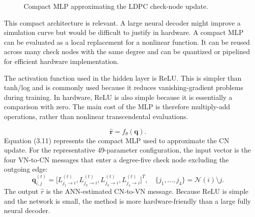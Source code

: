 \begin{figure}[H]
\centering
{}
\caption{Compact MLP approximating the LDPC check-node update.}
\label{fig:ann_ldpc_mlp}
\end{figure}

This compact architecture is relevant. A large neural decoder might improve a simulation curve but would be difficult to justify in hardware. A compact MLP can be evaluated as a local replacement for a nonlinear function. It can be reused across many check nodes with the same degree and can be quantized or pipelined for efficient hardware implementation.

The activation function used in the hidden layer is ReLU. This is simpler than tanh/log and is commonly used because it reduces vanishing-gradient problems during training. In hardware, ReLU is also simple because it is essentially a comparison with zero. The main cost of the MLP is therefore multiply-add operations, rather than nonlinear transcendental evaluations.

\begin{equation}
\hat{\mathbf{r}}=f_{\theta}(\mathbf{q}).
\end{equation}
Equation (3.11) represents the compact MLP used to approximate the CN update. For the representative 49-parameter configuration, the input vector is the four VN-to-CN messages that enter a degree-five check node excluding the outgoing edge:
\begin{equation*}
\mathbf{q}_{i,j}^{(t)}=
\big[L_{j_1\rightarrow i}^{(t)},L_{j_2\rightarrow i}^{(t)},L_{j_3\rightarrow i}^{(t)},L_{j_4\rightarrow i}^{(t)}\big]^T,\quad
\{j_1,\ldots,j_4\}=\mathcal{N}(i)\setminus j .
\end{equation*}
The output $\hat{r}$ is the ANN-estimated CN-to-VN message. Because ReLU is simple and the network is small, the method is more hardware-friendly than a large fully neural decoder.

